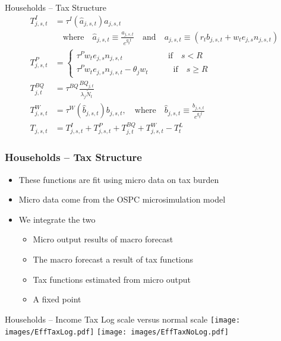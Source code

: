 \documentclass{beamer}
\begin{document}
  \begin{frame}{Households -- Tax Structure}
    \begin{align}
      T^I_{j,s,t} & = \tau^I(\hat{a}_{j,s,t})a_{j,s,t} \nonumber \\
      & \quad\text{where}\quad \hat{a}_{j,s,t}\equiv\frac{a_{j,s,t}}{e^{g_y t}} \quad\text{and}\quad a_{j,s,t} \equiv (r_t b_{j,s,t} + w_t e_{j,s}n_{j,s,t}) \nonumber \\
      T^P_{j,s,t} & =
        \begin{cases}
          \tau^P w_t e_{j,s}n_{j,s,t} \quad\quad\quad\quad\quad\:\:\text{if}\quad s<R \\
          \tau^P w_t e_{j,s}n_{j,s,t} - \theta_j w_t \quad\quad\quad\text{if}\quad s\geq R
        \end{cases}  \nonumber \\
      T^{BQ}_{j,t} & = \tau^{BQ} \frac{BQ_{j,t}}{\lambda_j\tilde{N}_t}  \nonumber \\
      T^W_{j,s,t} & = \tau^W(\hat b_{j,s,t}) b_{j,s,t},\quad\text{where}\quad \hat{b}_{j,s,t}\equiv\frac{b_{j,s,t}}{e^{g_y t}}  \nonumber \\
      T_{j,s,t} & = T^I_{j,s,t} + T^P_{j,s,t} + T^{BQ}_{j,t} + T^W_{j,s,t} - T^L_{t} \nonumber
    \end{align}
  \end{frame}

  \begin{frame}
    \frametitle{Households -- Tax Structure}
      \begin{itemize}
      \item These functions are fit using micro data on tax burden
      \item Micro data come from the OSPC microsimulation model
      \item We integrate the two
      \begin{itemize}
      	\item Micro output results of macro forecast
      	\item The macro forecast a result of tax functions
      	\item Tax functions estimated from micro output
      	\item A fixed point
      	\end{itemize}
      \end{itemize}
  \end{frame}

  \begin{frame}{Households -- Income Tax}\label{Income Tax}
    Log scale versus normal scale
    \texttt{[image: images/EffTaxLog.pdf]}
    \texttt{[image: images/EffTaxNoLog.pdf]}
  \end{frame}
\end{document}
